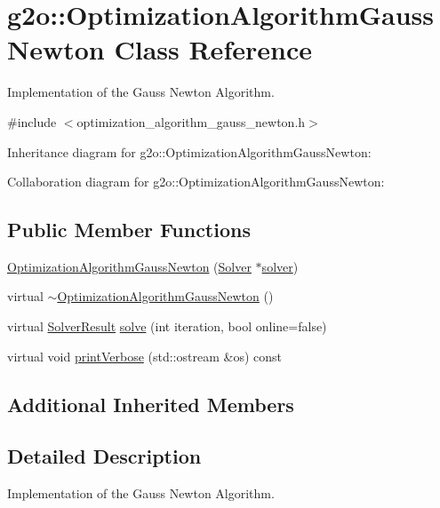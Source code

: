 \hypertarget{classg2o_1_1OptimizationAlgorithmGaussNewton}{}\section{g2o\+:\+:Optimization\+Algorithm\+Gauss\+Newton Class Reference}
\label{classg2o_1_1OptimizationAlgorithmGaussNewton}


Implementation of the Gauss Newton Algorithm.  




{\ttfamily \#include $<$optimization\+\_\+algorithm\+\_\+gauss\+\_\+newton.\+h$>$}



Inheritance diagram for g2o\+:\+:Optimization\+Algorithm\+Gauss\+Newton\+:


Collaboration diagram for g2o\+:\+:Optimization\+Algorithm\+Gauss\+Newton\+:
\subsection*{Public Member Functions}
\begin{DoxyCompactItemize}
\item 
\hyperlink{classg2o_1_1OptimizationAlgorithmGaussNewton_aca16df79fa14caf3e77bef0ca9aaedc4}{Optimization\+Algorithm\+Gauss\+Newton} (\hyperlink{classg2o_1_1Solver}{Solver} $\ast$\hyperlink{classg2o_1_1OptimizationAlgorithmWithHessian_a85473a4073c76b1a52cf9cf175e31c45}{solver})
\item 
virtual \hyperlink{classg2o_1_1OptimizationAlgorithmGaussNewton_ac86bc6829b12453693ee2c3967b11f0b}{$\sim$\+Optimization\+Algorithm\+Gauss\+Newton} ()
\item 
virtual \hyperlink{classg2o_1_1OptimizationAlgorithm_a705d58d7bc19528a8ab718570d090cdf}{Solver\+Result} \hyperlink{classg2o_1_1OptimizationAlgorithmGaussNewton_aba0b67eecaca01c576de7e605e5af5f1}{solve} (int iteration, bool online=false)
\item 
virtual void \hyperlink{classg2o_1_1OptimizationAlgorithmGaussNewton_a23d9d274c44841e034a9b4c93530ee18}{print\+Verbose} (std\+::ostream \&os) const 
\end{DoxyCompactItemize}
\subsection*{Additional Inherited Members}


\subsection{Detailed Description}
Implementation of the Gauss Newton Algorithm. 

